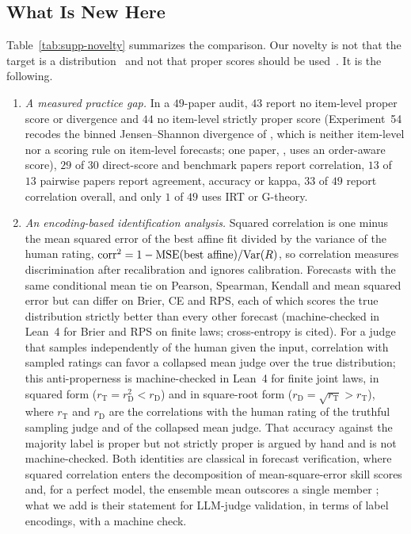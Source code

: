 \subsection{What Is New Here}
\label{sec:supp-new}
Table~\ref{tab:supp-novelty} summarizes the comparison.
Our novelty is not that the target is a distribution~\citep{pavlick2019inherent,plank2022problem} and not that proper scores should be used~\citep{li2026judging,lyu2026humanresidual}.
It is the following.
\begin{enumerate}
\item \emph{A measured practice gap.} In a $49$-paper audit, $43$ report no item-level proper score or divergence and $44$ no item-level strictly proper score (Experiment~54 recodes the binned Jensen--Shannon divergence of \citet{elangovan2025beyond}, which is neither item-level nor a scoring rule on item-level forecasts; one paper, \citet{lyu2026humanresidual}, uses an order-aware score), $29$ of $30$ direct-score and benchmark papers report correlation, $13$ of $13$ pairwise papers report agreement, accuracy or kappa, $33$ of $49$ report correlation overall, and only $1$ of $49$ uses IRT or G-theory.
\item \emph{An encoding-based identification analysis.} Squared correlation is one minus the mean squared error of the best affine fit divided by the variance of the human rating, $\operatorname{corr}^2 = 1 - \mathrm{MSE}(\text{best affine})/\mathrm{Var}(R)$, so correlation measures discrimination after recalibration and ignores calibration.
Forecasts with the same conditional mean tie on Pearson, Spearman, Kendall and mean squared error but can differ on Brier, CE and RPS, each of which scores the true distribution strictly better than every other forecast (machine-checked in Lean~4 for Brier and RPS on finite laws; cross-entropy is cited).
For a judge that samples independently of the human given the input, correlation with sampled ratings can favor a collapsed mean judge over the true distribution; this anti-properness is machine-checked in Lean~4 for finite joint laws, in squared form ($r_{\mathrm{T}}=r_{\mathrm{D}}^2<r_{\mathrm{D}}$) and in square-root form ($r_{\mathrm{D}}=\sqrt{r_{\mathrm{T}}}>r_{\mathrm{T}}$), where $r_{\mathrm{T}}$ and $r_{\mathrm{D}}$ are the correlations with the human rating of the truthful sampling judge and of the collapsed mean judge.
That accuracy against the majority label is proper but not strictly proper is argued by hand and is not machine-checked.
Both identities are classical in forecast verification, where squared correlation enters the decomposition of mean-square-error skill scores \citep{murphy1988skill,murphy1989skill} and, for a perfect model, the ensemble mean outscores a single member \citep{kumar2000analysis}; what we add is their statement for LLM-judge validation, in terms of label encodings, with a machine check.

\end{enumerate}
